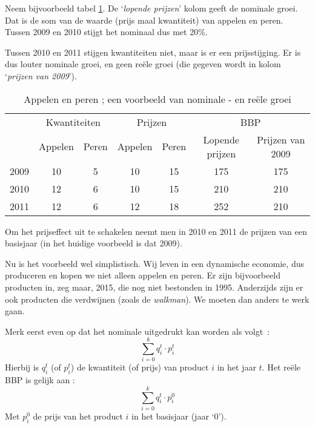 \par Neem bijvoorbeeld tabel \ref{tab:h5appe}. De `\textit{lopende prijzen}' kolom geeft de nominale groei. Dat is de som van de waarde (prijs maal kwantiteit) van appelen en peren. Tussen 2009 en 2010 stijgt het nominaal  dus met 20\%.
\par Tussen 2010 en 2011 stijgen kwantiteiten niet, maar is er een prijsstijging. Er is dus louter nominale groei, en geen re\"ele groei (die gegeven wordt in kolom `\textit{prijzen van 2009}').

\begin{table}[H]
\centering
\begin{tabular}{ccccccc}
 & \multicolumn{2}{c}{Kwantiteiten} & \multicolumn{2}{c}{Prijzen} & \multicolumn{2}{c}{BBP} \\
 & Appelen & Peren & Appelen & Peren & Lopende prijzen & Prijzen van 2009 \\ \hline
2009 & 10 & 5 & 10 & 15 & 175 & 175 \\
2010 & 12 & 6 & 10 & 15 & 210 & 210 \\
2011 & 12 & 6 & 12 & 18 & 252 & 210
\end{tabular}
\caption{Appelen en peren ; een voorbeeld van nominale - en re\"ele groei}
\label{tab:h5appe}
\end{table}

Om het prijseffect uit te schakelen neemt men in 2010 en 2011 de prijzen van een basisjaar (in het huidige voorbeeld is dat 2009).\\

\par Nu is het voorbeeld wel simplistisch. Wij leven in een dynamische economie, dus produceren en kopen we niet alleen appelen en peren. Er zijn bijvoorbeeld producten in, zeg maar, 2015, die nog niet bestonden in 1995. Anderzijds zijn er ook producten die verdwijnen (zoals de \textit{walkman}). We moeten dan anders te werk gaan.\\

\par Merk eerst even op dat het nominale  uitgedrukt kan worden als \mbox{volgt :}
$$\sum_{i=0}^k q_i^t\cdot p_i^t$$
Hierbij is $q_i^t$ (of $p_i^t$) de kwantiteit (of prijs) van product $i$ in het jaar $t$. Het re\"ele BBP is gelijk aan :
$$\sum_{i=0}^k q_i^t\cdot p_i^0$$
Met $p_i^0$ de prijs van het product $i$ in het basisjaar (jaar `0'). \\

